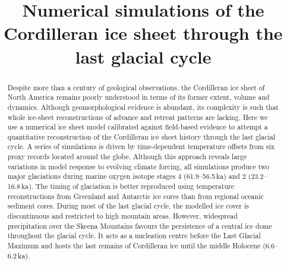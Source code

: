 \documentclass[tc, manuscript]{copernicus}
\begin{document}
\hack{\sloppy}


\title{Numerical simulations of the Cordilleran ice sheet
       through the last glacial cycle}







\hack{\allowdisplaybreaks}

\published{}


\maketitle


\begin{abstract}
Despite more than a century of geological observations, the
Cordilleran ice sheet of North America remains poorly understood in
terms of its former extent, volume and dynamics. Although
geomorphological evidence is abundant, its complexity is such that
whole ice-sheet reconstructions of advance and retreat patterns are
lacking. Here we use a numerical ice sheet model calibrated against
field-based evidence to attempt a quantitative reconstruction of the
Cordilleran ice sheet history through the last glacial
cycle. A series of simulations is driven by time-dependent
temperature offsets from six proxy records located around the
globe. Although this approach reveals large variations in model
response to evolving climate forcing, all simulations produce two
major glaciations during marine oxygen isotope stages 4
(61.9--56.5\,\unit{ka}) and 2 (23.2--16.8\,\unit{ka}). The timing of
glaciation is better reproduced using temperature reconstructions
from Greenland and Antarctic ice cores than from regional oceanic
sediment cores. During most of the last glacial cycle, the modelled
ice cover is discontinuous and restricted to high mountain
areas. However, widespread precipitation over the Skeena Mountains
favours the persistence of a central ice dome throughout the glacial
cycle. It acts as a nucleation centre before the Last Glacial
Maximum and hosts the last remains of Cordilleran ice until the
middle Holocene (6.6--6.2\,\unit{ka}).
\end{abstract}
\end{document}
